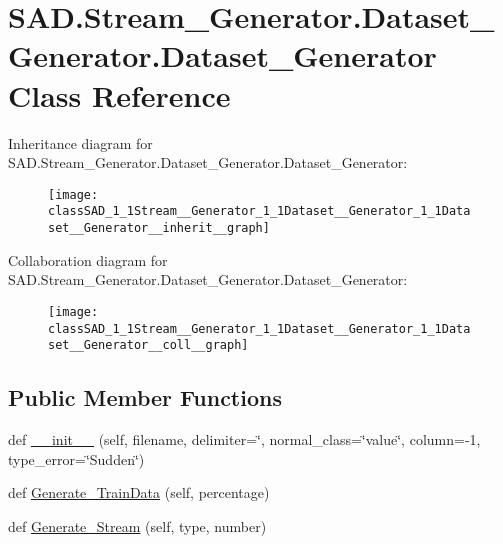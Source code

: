\hypertarget{classSAD_1_1Stream__Generator_1_1Dataset__Generator_1_1Dataset__Generator}{}\section{S\+A\+D.\+Stream\+\_\+\+Generator.\+Dataset\+\_\+\+Generator.\+Dataset\+\_\+\+Generator Class Reference}
\label{classSAD_1_1Stream__Generator_1_1Dataset__Generator_1_1Dataset__Generator}


Inheritance diagram for S\+A\+D.\+Stream\+\_\+\+Generator.\+Dataset\+\_\+\+Generator.\+Dataset\+\_\+\+Generator\+:\nopagebreak
\begin{figure}[H]
\begin{center}
\leavevmode
\texttt{[image: classSAD\_1\_1Stream\_\_Generator\_1\_1Dataset\_\_Generator\_1\_1Dataset\_\_Generator\_\_inherit\_\_graph]}
\end{center}
\end{figure}


Collaboration diagram for S\+A\+D.\+Stream\+\_\+\+Generator.\+Dataset\+\_\+\+Generator.\+Dataset\+\_\+\+Generator\+:\nopagebreak
\begin{figure}[H]
\begin{center}
\leavevmode
\texttt{[image: classSAD\_1\_1Stream\_\_Generator\_1\_1Dataset\_\_Generator\_1\_1Dataset\_\_Generator\_\_coll\_\_graph]}
\end{center}
\end{figure}
\subsection*{Public Member Functions}
\begin{DoxyCompactItemize}
\item 
def \hyperlink{classSAD_1_1Stream__Generator_1_1Dataset__Generator_1_1Dataset__Generator_a96fe8d29f2e2d15797d6ed779df19648}{\+\_\+\+\_\+init\+\_\+\+\_\+} (self, filename, delimiter=\char`\"{},  normal\+\_\+class=\char`\"{}value\char`\"{},  column=-\/1,  type\+\_\+error=\char`\"{}Sudden\char`\"{})
\item 
def \hyperlink{classSAD_1_1Stream__Generator_1_1Dataset__Generator_1_1Dataset__Generator_ab370a4bfa53c33a13085cae10de52a5a}{Generate\+\_\+\+Train\+Data} (self, percentage)
\item 
def \hyperlink{classSAD_1_1Stream__Generator_1_1Dataset__Generator_1_1Dataset__Generator_a168344d3d081678884e42083cc0ef033}{Generate\+\_\+\+Stream} (self, type, number)
\end{DoxyCompactItemize}
